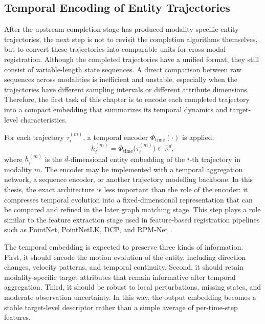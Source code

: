 \subsection{Temporal Encoding of Entity Trajectories}
After the upstream completion stage has produced modality-specific entity trajectories, the next step is not to revisit the completion algorithms themselves, but to convert these trajectories into comparable units for cross-modal registration. Although the completed trajectories have a unified format, they still consist of variable-length state sequences. A direct comparison between raw sequences across modalities is inefficient and unstable, especially when the trajectories have different sampling intervals or different attribute dimensions. Therefore, the first task of this chapter is to encode each completed trajectory into a compact embedding that summarizes its temporal dynamics and target-level characteristics.

For each trajectory \(\tau_i^{(m)}\), a temporal encoder \(\Phi_{\mathrm{time}}(\cdot)\) is applied:
\begin{equation}
  h_i^{(m)} = \Phi_{\mathrm{time}}\big(\tau_i^{(m)}\big) \in \mathbb{R}^{d},
\end{equation}
where \(h_i^{(m)}\) is the \(d\)-dimensional entity embedding of the \(i\)-th trajectory in modality \(m\). The encoder may be implemented with a temporal aggregation network, a sequence encoder, or another trajectory modelling backbone. In this thesis, the exact architecture is less important than the role of the encoder: it compresses temporal evolution into a fixed-dimensional representation that can be compared and refined in the later graph matching stage. This step plays a role similar to the feature extraction stage used in feature-based registration pipelines such as PointNet, PointNetLK, DCP, and RPM-Net \cite{qi2017pointnet,aoki2019pointnetlk,wang2019dcp,yew2020rpmnet}.

The temporal embedding is expected to preserve three kinds of information. First, it should encode the motion evolution of the entity, including direction changes, velocity patterns, and temporal continuity. Second, it should retain modality-specific target attributes that remain informative after temporal aggregation. Third, it should be robust to local perturbations, missing states, and moderate observation uncertainty. In this way, the output embedding becomes a stable target-level descriptor rather than a simple average of per-time-step features.

